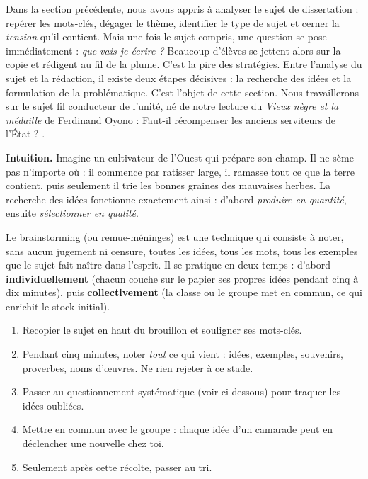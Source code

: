\documentclass[11pt]{article}
\newcommand{\cle}[1]{{\popxbold\color{popdark}#1}}
\newcounter{popsec}
\newcounter{popsub}
\newcommand{\courssub}[1]{%
  \stepcounter{popsub}%
  \par\vspace{9pt}\noindent{\popxbold\fontsize{11.5}{13}\selectfont\color{popink}{\color{poporange}\thepopsec.\thepopsub}\hspace{6pt}#1}\par\nopagebreak\vspace{4pt}
}
\begin{document}
Dans la section précédente, nous avons appris à \cle{analyser le sujet} de dissertation : repérer les mots-clés, dégager le thème, identifier le type de sujet et cerner la \emph{tension} qu'il contient. Mais une fois le sujet compris, une question se pose immédiatement : \emph{que vais-je écrire ?} Beaucoup d'élèves se jettent alors sur la copie et rédigent au fil de la plume. C'est la pire des stratégies. Entre l'analyse du sujet et la rédaction, il existe deux étapes décisives : la \cle{recherche des idées} et la \cle{formulation de la problématique}. C'est l'objet de cette section. Nous travaillerons sur le sujet fil conducteur de l'unité, né de notre lecture du \emph{Vieux nègre et la médaille} de Ferdinand Oyono : \og Faut-il récompenser les anciens serviteurs de l'État ? \fg.

\courssub{Les techniques de recherche des idées}

\textbf{Intuition.} Imagine un cultivateur de l'Ouest qui prépare son champ. Il ne sème pas n'importe où : il commence par ratisser large, il ramasse tout ce que la terre contient, puis seulement il trie les bonnes graines des mauvaises herbes. La recherche des idées fonctionne exactement ainsi : d'abord \emph{produire en quantité}, ensuite \emph{sélectionner en qualité}.

\begin{definition}
Le \cle{brainstorming} (ou remue-méninges) est une technique qui consiste à noter, sans aucun jugement ni censure, toutes les idées, tous les mots, tous les exemples que le sujet fait naître dans l'esprit. Il se pratique en deux temps : d'abord \textbf{individuellement} (chacun couche sur le papier ses propres idées pendant cinq à dix minutes), puis \textbf{collectivement} (la classe ou le groupe met en commun, ce qui enrichit le stock initial).
\end{definition}

\begin{methode}
\begin{enumerate}
\item Recopier le sujet en haut du brouillon et souligner ses mots-clés.
\item Pendant cinq minutes, noter \emph{tout} ce qui vient : idées, exemples, souvenirs, proverbes, noms d'œuvres. Ne rien rejeter à ce stade.
\item Passer au questionnement systématique (voir ci-dessous) pour traquer les idées oubliées.
\item Mettre en commun avec le groupe : chaque idée d'un camarade peut en déclencher une nouvelle chez toi.
\item Seulement après cette récolte, passer au tri.
\end{enumerate}
\end{methode}
\end{document}
